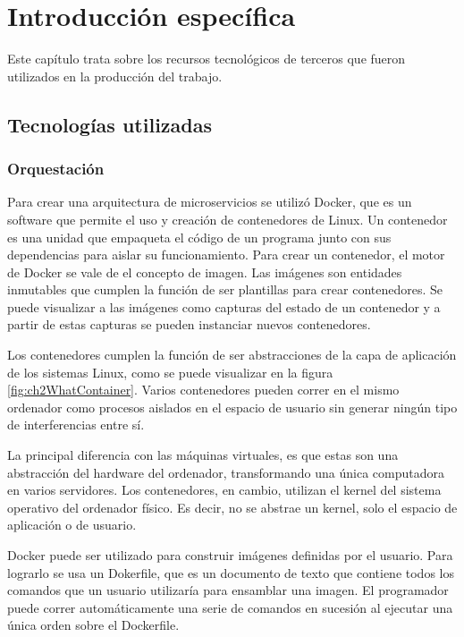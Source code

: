 \chapter{Introducción específica} %

\label{Chapter2}

Este capítulo trata sobre los recursos tecnológicos de terceros que fueron utilizados en la producción del trabajo.

\section{Tecnologías utilizadas}

\subsection{Orquestación}
Para crear una arquitectura de microservicios se utilizó Docker, que es un software que permite el uso y creación de contenedores de Linux.
Un contenedor es una unidad que empaqueta el código de un programa junto con sus dependencias para aislar su funcionamiento.
Para crear un contenedor, el motor de Docker se vale de el concepto de imagen.
Las imágenes son entidades inmutables que cumplen la función de ser plantillas para crear contenedores.
Se puede visualizar a las imágenes como capturas del estado de un contenedor y a partir de estas capturas se pueden instanciar nuevos contenedores.

Los contenedores cumplen la función de ser abstracciones de la capa de aplicación de los sistemas Linux, como se puede visualizar en la figura \ref{fig:ch2WhatContainer}.
Varios contenedores pueden correr en el mismo ordenador como procesos aislados en el espacio de usuario sin generar ningún tipo de interferencias entre sí.

La principal diferencia con las máquinas virtuales, es que estas son una abstracción del hardware del ordenador, transformando una única computadora en varios servidores.
Los contenedores, en cambio, utilizan el kernel del sistema operativo del ordenador físico.
Es decir, no se abstrae un kernel, solo el espacio de aplicación o de usuario.

Docker puede ser utilizado para construir imágenes definidas por el usuario.
Para lograrlo se usa un Dokerfile, que es un documento de texto que contiene todos los comandos que un usuario utilizaría para ensamblar una imagen.
El programador puede correr automáticamente una serie de comandos en sucesión al ejecutar una única orden sobre el Dockerfile.

